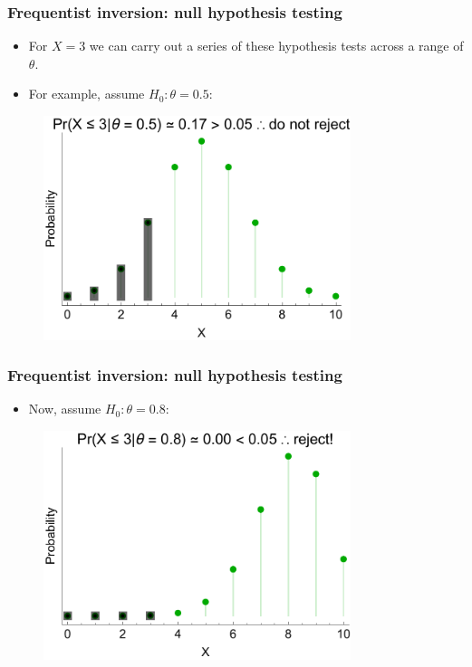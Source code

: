 \documentclass[handout]{beamer}
\begin{document}
\begin{frame}
	\frametitle{Frequentist inversion: null hypothesis testing}
	
	\begin{itemize}
		\item<2-> For $X=3$ we can carry out a series of these hypothesis tests across a range of $\theta$.
		\item<3-> For example, assume $H_0: \theta=0.5$:
	\end{itemize}
	
	\begin{figure}[ht]
		\centerline{\includegraphics[width=0.8\textwidth]{animations_figures/binomial_h0_accept.pdf}}
	\end{figure}
	
\end{frame}

\begin{frame}
	\frametitle{Frequentist inversion: null hypothesis testing}
	
	\begin{itemize}
		\item<3-> Now, assume $H_0: \theta=0.8$:
	\end{itemize}
	
	\begin{figure}[ht]
		\centerline{\includegraphics[width=0.8\textwidth]{animations_figures/binomial_h0_reject.pdf}}
	\end{figure}
	
\end{frame}
\end{document}
